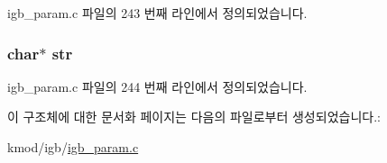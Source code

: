 igb\+\_\+param.\+c 파일의 243 번째 라인에서 정의되었습니다.

\subsubsection[{\texorpdfstring{str}{str}}]{\setlength{\rightskip}{0pt plus 5cm}char$\ast$ str}\hypertarget{structigb__opt__list_ab50d783982593ef993ea0b68f7ad8b80}{}\label{structigb__opt__list_ab50d783982593ef993ea0b68f7ad8b80}


igb\+\_\+param.\+c 파일의 244 번째 라인에서 정의되었습니다.



이 구조체에 대한 문서화 페이지는 다음의 파일로부터 생성되었습니다.\+:\begin{DoxyCompactItemize}
\item 
kmod/igb/\hyperlink{igb__param_8c}{igb\+\_\+param.\+c}\end{DoxyCompactItemize}
